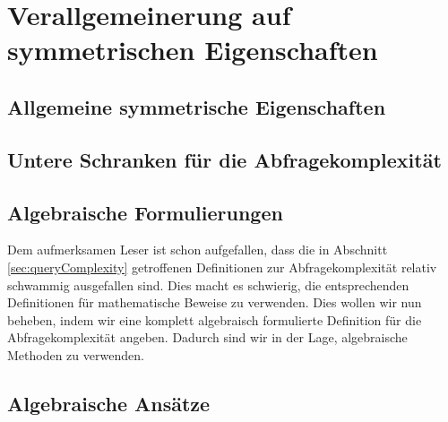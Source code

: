 \documentclass[a4paper]{scrreprt}
\theoremstyle{definition}
\begin{document}
\chapter{Verallgemeinerung auf symmetrischen Eigenschaften}

\section{Allgemeine symmetrische Eigenschaften}

\section{Untere Schranken für die Abfragekomplexität}

\section{Algebraische Formulierungen}
Dem aufmerksamen Leser ist schon aufgefallen, dass die in 
Abschnitt \ref{sec:queryComplexity} getroffenen Definitionen
zur Abfragekomplexität relativ schwammig ausgefallen sind.
Dies macht es schwierig, die entsprechenden Definitionen
für mathematische Beweise zu verwenden.
Dies wollen wir nun beheben, indem wir eine komplett algebraisch
formulierte Definition für die Abfragekomplexität angeben.
Dadurch sind wir in der Lage, algebraische Methoden zu verwenden.


\section{Algebraische Ansätze}


\printbibliography
\end{document}
